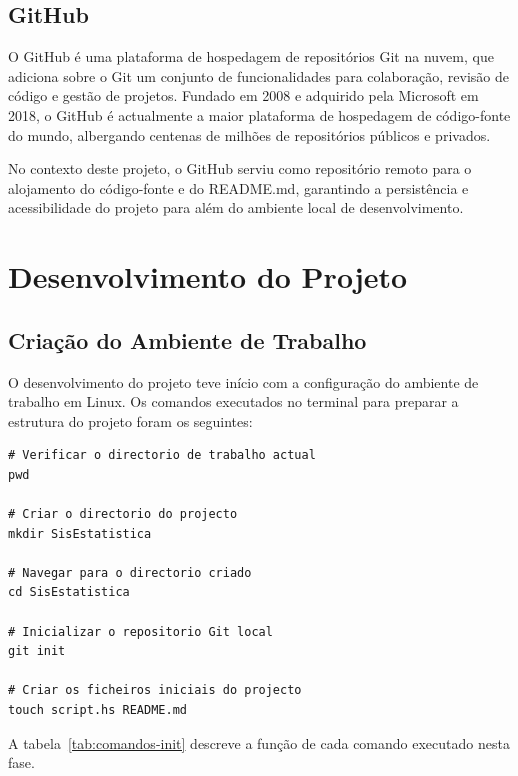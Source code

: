 \documentclass[12pt, a4paper, oneside]{report}
\begin{document}
\section{GitHub}

O GitHub é uma plataforma de hospedagem de repositórios Git na nuvem, que adiciona sobre o Git um conjunto de funcionalidades para colaboração, revisão de código e gestão de projetos. Fundado em 2008 e adquirido pela Microsoft em 2018, o GitHub é actualmente a maior plataforma de hospedagem de código-fonte do mundo, albergando centenas de milhões de repositórios públicos e privados.

No contexto deste projeto, o GitHub serviu como repositório remoto para o alojamento do código-fonte e do README.md, garantindo a persistência e acessibilidade do projeto para além do ambiente local de desenvolvimento.

\chapter{Desenvolvimento do Projeto}

\section{Criação do Ambiente de Trabalho}

O desenvolvimento do projeto teve início com a configuração do ambiente de trabalho em Linux. Os comandos executados no terminal para preparar a estrutura do projeto foram os seguintes:

\begin{lstlisting}[style=bash, caption={Comandos de inicialização do ambiente de trabalho}, label=lst:init]
# Verificar o directorio de trabalho actual
pwd

# Criar o directorio do projecto
mkdir SisEstatistica

# Navegar para o directorio criado
cd SisEstatistica

# Inicializar o repositorio Git local
git init

# Criar os ficheiros iniciais do projecto
touch script.hs README.md
\end{lstlisting}

A tabela~\ref{tab:comandos-init} descreve a função de cada comando executado nesta fase.
\end{document}
